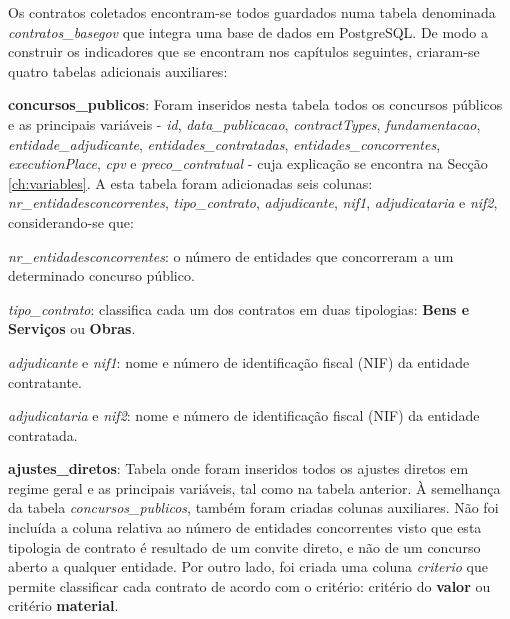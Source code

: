 Os contratos coletados encontram-se todos guardados numa tabela denominada \textit{contratos\_basegov} que integra uma base de dados em PostgreSQL. De modo a construir os indicadores que se encontram nos capítulos seguintes, criaram-se quatro tabelas adicionais auxiliares:

\begin{my_itemize}


	\item \textbf{concursos\_publicos}: Foram inseridos nesta tabela todos os concursos públicos e as principais variáveis - \textit{id}, \textit{data\_publicacao}, \textit{contractTypes}, \textit{fundamentacao}, \textit{entidade\_adjudicante}, \textit{entidades\_contratadas}, \textit{entidades\_concorrentes}, \textit{executionPlace}, \textit{cpv} e \textit{preco\_contratual} - cuja explicação se encontra na Secção \ref{ch:variables}. A esta tabela foram adicionadas seis colunas:  \textit{nr\_entidadesconcorrentes}, \textit{tipo\_contrato}, \textit{adjudicante}, \textit{nif1}, \textit{adjudicataria} e \textit{nif2}, considerando-se que: 
	
	\begin{my_itemize}
		
		 \item \textit{nr\_entidadesconcorrentes}: o número de entidades que concorreram a um determinado concurso público.
		 
		 \item \textit{tipo\_contrato}: classifica cada um dos contratos em duas tipologias: \textbf{Bens e Serviços} ou \textbf{Obras}. 
		 
		 \item \textit{adjudicante} e \textit{nif1}: nome e número de identificação fiscal (NIF) da entidade contratante.
		 
		 \item \textit{adjudicataria} e \textit{nif2}: nome e número de identificação fiscal (NIF) da entidade contratada.
		 
	\end{my_itemize}
	
	
	\item \textbf{ajustes\_diretos}: Tabela onde foram inseridos todos os ajustes diretos em regime geral e as principais variáveis, tal como na tabela anterior. À semelhança da tabela \textit{concursos\_publicos}, também foram criadas colunas auxiliares. Não foi incluída a coluna relativa ao número de entidades concorrentes visto que esta tipologia de contrato é resultado de um convite direto, e não de um concurso aberto a qualquer entidade. Por outro lado, foi criada uma coluna \textit{criterio} que permite classificar cada contrato de acordo com o critério: critério do \textbf{valor} ou critério \textbf{material}.


\end{my_itemize}
